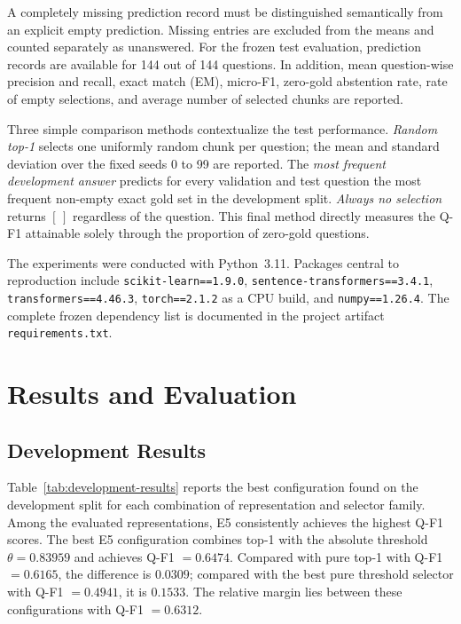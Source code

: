 \documentclass[11pt]{article}
\begin{document}
A completely missing prediction record must be distinguished semantically from an explicit empty prediction. Missing entries are excluded from the means and counted separately as unanswered. For the frozen test evaluation, prediction records are available for 144 out of 144 questions. In addition, mean question-wise precision and recall, exact match (EM), micro-F1, zero-gold abstention rate, rate of empty selections, and average number of selected chunks are reported.

Three simple comparison methods contextualize the test performance. \emph{Random top-1} selects one uniformly random chunk per question; the mean and standard deviation over the fixed seeds 0 to 99 are reported. The \emph{most frequent development answer} predicts for every validation and test question the most frequent non-empty exact gold set in the development split. \emph{Always no selection} returns $[\,]$ regardless of the question. This final method directly measures the Q-F1 attainable solely through the proportion of zero-gold questions.

The experiments were conducted with Python~3.11. Packages central to reproduction include \texttt{scikit-learn==1.9.0}, \texttt{sentence-transformers==3.4.1}, \texttt{transformers==4.46.3}, \texttt{torch==2.1.2} as a CPU build, and \texttt{numpy==1.26.4}. The complete frozen dependency list is documented in the project artifact \texttt{requirements.txt}.


\section{Results and Evaluation}

\subsection{Development Results}

Table~\ref{tab:development-results} reports the best configuration found on the development split for each combination of representation and selector family. Among the evaluated representations, E5 consistently achieves the highest Q-F1 scores. The best E5 configuration combines top-1 with the absolute threshold $\theta=0.83959$ and achieves Q-F1 $=0.6474$. Compared with pure top-1 with Q-F1 $=0.6165$, the difference is $0.0309$; compared with the best pure threshold selector with Q-F1 $=0.4941$, it is $0.1533$. The relative margin lies between these configurations with Q-F1 $=0.6312$.
\end{document}
